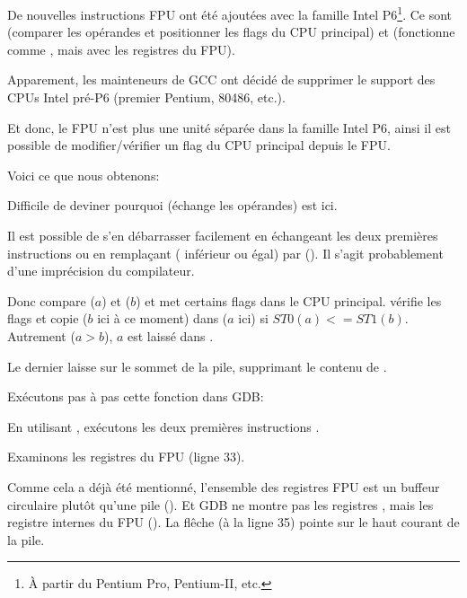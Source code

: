 \label{gcc481_o3}

De nouvelles instructions FPU ont été ajoutées avec la famille Intel P6\footnote{À partir du Pentium Pro, Pentium-II, etc.}.
Ce sont  (comparer les opérandes et positionner les flags du CPU principal)
et 
 (fonctionne comme , mais avec les registres du FPU).

Apparement, les mainteneurs de GCC ont décidé de supprimer le support des CPUs Intel
pré-P6 (premier Pentium, 80486, etc.).

Et donc, le FPU n'est plus une unité séparée dans la famille Intel P6, ainsi il est
possible de modifier/vérifier un flag du CPU principal depuis le FPU.

Voici ce que nous obtenons:



Difficile de deviner pourquoi  (échange les opérandes) est ici.

Il est possible de s'en débarrasser facilement en échangeant les deux premières instructions
\FLD ou en remplaçant  ( inférieur ou égal) par
 ().
Il s'agit probablement d'une imprécision du compilateur.

Donc  compare  ($a$) et  ($b$) et met certains flags
dans le CPU principal.
 vérifie les flags et copie  ($b$ ici à ce moment) dans 
($a$ ici) si $ST0 (a) <= ST1 (b)$.
Autrement ($a>b$), $a$ est laissé dans .

Le dernier \FSTP laisse  sur le sommet de la pile, supprimant le contenu de .

Exécutons pas à pas cette fonction dans GDB:



En utilisant , exécutons les deux premières instructions \FLD.

Examinons les registres du FPU (ligne 33).

Comme cela a déjà été mentionné, l'ensemble des registres FPU est un buffeur
circulaire plutôt qu'une pile ().
Et GDB ne montre pas les registres , mais les registre internes du FPU ().
La flêche (à la ligne 35) pointe sur le haut courant de la pile.


